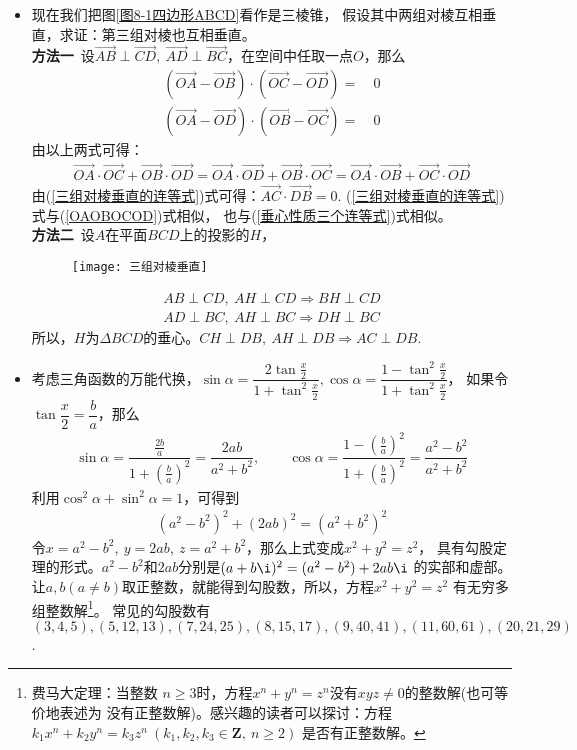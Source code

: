 \begin{itemize}[leftmargin=\inteval{\myitemleftmargin}pt,itemsep=
   \inteval{\myitemitempsep}pt,topsep=\inteval{\myitemtopsep}pt]
\item 现在我们把图\ref{图8-1四边形ABCD}看作是三棱锥，
假设其中两组对棱互相垂直，求证：第三组对棱也互相垂直。\\
\textbf{方法一}\ 设$ \vec{AB}\perp \vec{CD},\ 
\vec{AD}\perp \vec{BC} $，在空间中任取一点$ O $，那么
\begin{align*}
    (\vec{OA}-\vec{OB})\cdot
    (\vec{OC}-\vec{OD}) =&\ 0  \\
    (\vec{OA}-\vec{OD})\cdot
    (\vec{OB}-\vec{OC}) =&\ 0 
\end{align*}
由以上两式可得：
\begin{align}\label{三组对棱垂直的连等式}
    \vec{OA}\cdot \vec{OC}+
    \vec{OB}\cdot \vec{OD}=
    \vec{OA}\cdot \vec{OD}+
    \vec{OB}\cdot \vec{OC}=
    \vec{OA}\cdot \vec{OB}+
    \vec{OC}\cdot \vec{OD}
\end{align}
由(\ref{三组对棱垂直的连等式})式可得：$ \vec{AC}\cdot
\vec{DB}=0 $. (\ref{三组对棱垂直的连等式})式与(\ref{OAOBOCOD})式相似，
也与(\ref{垂心性质三个连等式})式相似。\\
\textbf{方法二}\ 设$ A $在平面$ BCD $上的投影的$ H $，
\begin{figure}[h]
    \centering
    \texttt{[image: 三组对棱垂直]}
\end{figure}
\begin{align*}
    AB\perp CD,\ AH\perp CD \Rightarrow BH\perp CD \\
    AD\perp BC,\ AH\perp BC \Rightarrow DH\perp BC 
\end{align*}
所以，$ H $为$ \Delta BCD $的垂心。$ CH\perp DB,\ AH\perp DB \Rightarrow 
AC\perp DB $. 

\item 考虑三角函数的万能代换，$ \sin\alpha=\dfrac{2\tan \frac{x}{2}}{1+\tan^2 \frac{x}{2}},\cos\alpha=\dfrac{1-\tan^2 \frac{x}{2}}{1+\tan^2 \frac{x}{2}} $，
如果令$ \tan\dfrac{x}{2}=\dfrac{b}{a} $，那么
\begin{align*}
    \sin\alpha=\dfrac{\frac{2b}{a}}{1+\left(\frac{b}{a}\right)^2}=
    \dfrac{2ab}{a^2+b^2},\quad\quad \cos\alpha=\dfrac{1-\left(\frac{b}{a}
    \right)^2}{1+\left(\frac{b}{a}\right)^2}=\dfrac{a^2-b^2}{a^2+b^2}
\end{align*}
利用$ \cos^2 \alpha+\sin^2 \alpha=1 $，可得到
\begin{gather}\label{勾股定理正整数解通式}
    (a^2-b^2)^2+(2ab)^2=(a^2+b^2)^2
\end{gather}
令$ x=a^2-b^2,\ y=2ab,\ z=a^2+b^2 $，那么上式变成$ x^2+y^2=z^2 $，
具有勾股定理的形式。$ a^2-b^2 $和$ 2ab $分别是$ (a+b\i)^2=(a^2-b^2)+2ab\i $
的实部和虚部。
让$ a,b (a\neq b) $取正整数，就能得到勾股数，所以，方程$ x^2+y^2=z^2 $
有无穷多组整数解\footnote{费马大定理：当整数
$ n\geq 3 $时，方程$ x^n+y^n=z^n $没有$ xyz\neq 0 $的整数解(也可等价地表述为
没有正整数解)。感兴趣的读者可以探讨：方程$ k_1 x^n+k_2 y^n=k_3 z^n \ 
(k_1,k_2,k_3\in \textbf{Z},\ n\geq 2 ) $ 是否有正整数解。}。
常见的勾股数有 $ (3,4,5),(5,12,13),(7,24,25),(8,15,17),(9,40,41),
(11,60,61),(20,21,29) $. 


\end{itemize}
